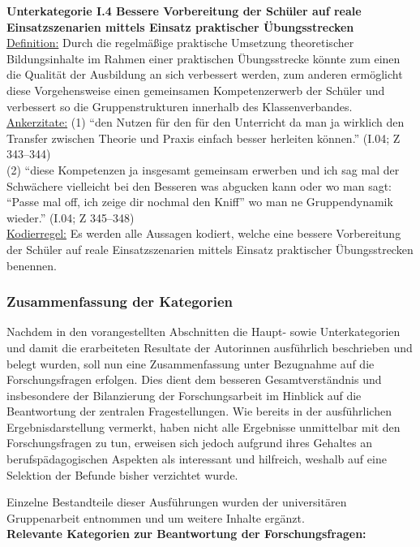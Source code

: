 \textbf{Unterkategorie I.4 Bessere Vorbereitung der Schüler auf reale Einsatzszenarien mittels Einsatz praktischer Übungsstrecken}\\
\underline{Definition:} Durch die regelmäßige praktische Umsetzung theoretischer Bildungsinhalte im Rahmen einer praktischen Übungsstrecke könnte zum einen die Qualität der Ausbildung an sich verbessert werden, zum anderen ermöglicht diese Vorgehensweise einen gemeinsamen Kompetenzerwerb der Schüler und verbessert so die Gruppenstrukturen innerhalb des Klassenverbandes.\\
\underline{Ankerzitate:} (1) "`den Nutzen für den für den Unterricht da man ja wirklich den Transfer zwischen Theorie und Praxis einfach besser herleiten können."' (I.04; Z 343--344)\\ (2) "`diese Kompetenzen ja insgesamt gemeinsam erwerben und ich sag mal der Schwächere vielleicht bei den Besseren was abgucken kann oder wo man sagt: "`Passe mal off, ich zeige dir nochmal den Kniff"' wo man ne Gruppendynamik wieder."' (I.04; Z 345--348)\\
\underline{Kodierregel:} Es werden alle Aussagen kodiert, welche eine bessere Vorbereitung der Schüler auf reale Einsatzszenarien mittels Einsatz praktischer Übungsstrecken benennen.

\subsubsection{Zusammenfassung der Kategorien}
\label{sec:ZusammenfassungDerKategorien}

Nachdem in den vorangestellten Abschnitten die Haupt- sowie Unterkategorien und damit die erarbeiteten Resultate der Autorinnen ausführlich beschrieben und belegt wurden, soll nun eine Zusammenfassung unter Bezugnahme auf die Forschungsfragen erfolgen. Dies dient dem besseren Gesamtverständnis und insbesondere der Bilanzierung der Forschungsarbeit im Hinblick auf die Beantwortung der zentralen Fragestellungen. Wie bereits in der ausführlichen Ergebnisdarstellung vermerkt, haben nicht alle Ergebnisse unmittelbar mit den Forschungsfragen zu tun, erweisen sich jedoch aufgrund ihres Gehaltes an berufspädagogischen Aspekten als interessant und hilfreich, weshalb auf eine Selektion der Befunde bisher verzichtet wurde. 

Einzelne Bestandteile dieser Ausführungen wurden der universitären Gruppenarbeit entnommen und um weitere Inhalte ergänzt.\\

\noindent
\textbf{Relevante Kategorien zur Beantwortung der Forschungsfragen:}\\

